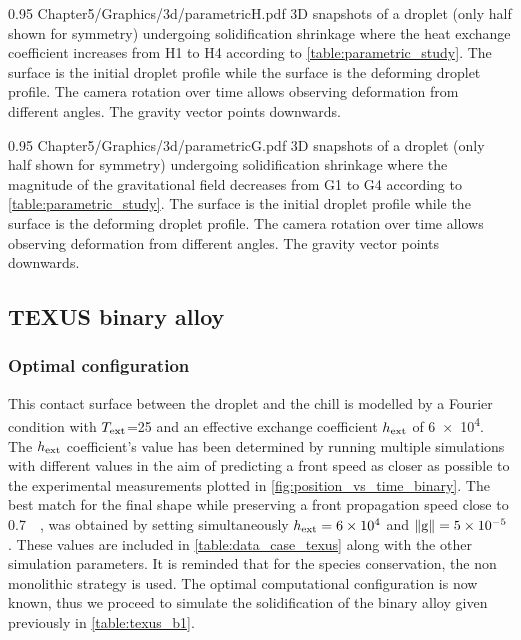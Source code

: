 \begin{figureth}
{0.95}
{Chapter5/Graphics/3d/parametricH.pdf}
{3D snapshots of a droplet (only half shown for symmetry) undergoing solidification shrinkage where the heat exchange coefficient 
increases from H1 to H4 according to \cref{table:parametric_study}. The  surface is the initial droplet profile while the  surface
is the deforming droplet profile. The camera rotation over time allows observing deformation from different angles. The gravity vector points downwards.}
\label{fig:parametricH}
\end{figureth}

\begin{figureth}
{0.95}
{Chapter5/Graphics/3d/parametricG.pdf}
{3D snapshots of a droplet (only half shown for symmetry) undergoing solidification shrinkage where the magnitude of the gravitational field
decreases from G1 to G4 according to \cref{table:parametric_study}. The  surface is the initial droplet profile while the  surface
is the deforming droplet profile. The camera rotation over time allows observing deformation from different angles.
The gravity vector points downwards.}
\label{fig:parametricG}
\end{figureth}


\subsection{TEXUS binary alloy}

\subsubsection{Optimal configuration}

This contact surface between the droplet and the chill is modelled by a Fourier condition with $T_{\text{ext}}$=\SI{25}{\udegC} 
and an effective exchange coefficient $h_{\text{ext}}$ of \SI{6e4}{\uhconvec}.
The $h_{\text{ext}}$ coefficient's value has been determined by running multiple simulations with different values in the aim
of predicting a front speed as closer as possible to the experimental measurements plotted in \cref{fig:position_vs_time_binary}.
The best match for the final shape while preserving a front propagation
speed close to \SI{0.7}{\milli \uvelocity}, was obtained by setting simultaneously 
$h_{\text{ext}}=6 \times 10^{4}$ \si{\uhconvec} and $\lVert \boldsymbol{\text{g}} \rVert=5\times 10^{-5}$ \si{\uacceleration}.
These values are included in \cref{table:data_case_texus} along with the other simulation parameters.
It is reminded that for the species conservation, the non monolithic strategy is used.
The optimal computational configuration is now known, thus we proceed to simulate the solidification 
of the binary alloy given previously in \cref{table:texus_b1}.

